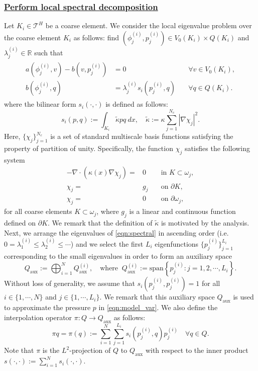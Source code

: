 \documentclass{article}[11pt]
\theoremstyle{definition}
\newcommand{\abs}[1]{\left |#1\right |}
\begin{document}
\subsubsection*{\underline{Perform local spectral decomposition}}
Let $K_i \in \mathcal{T}^H$ be a coarse element. %
We consider the local eigenvalue problem over the coarse element $K_i$ as follows: find $(\phi_j^{(i)}, p_j^{(i)}) \in V_0(K_i) \times Q(K_i)$ and $\lambda_j^{(i)} \in \mathbb{R}$ such that 
\begin{eqnarray}\label{eqn:spectral}
\begin{split}
a(\phi_{j}^{(i)}, v) - b(v, p_j^{(i)}) &=  0 & \quad \forall v \in V_0(K_i), \\
b(\phi_{j}^{(i)}, q) & = \lambda_j^{(i)} s_i ( p_j^{(i)},q)& \quad \forall q \in Q(K_i). 
\end{split}
\end{eqnarray}
where the bilinear form $s_i(\cdot,\cdot)$ is defined as follows:
$$ s_i(p,q) := \int_{K_i} \tilde \kappa pq ~ dx, \quad \tilde \kappa := \kappa \sum_{j=1}^{N_c} \abs{\nabla \chi_j}^2.$$
Here, $\{ \chi_j \}_{j=1}^{N_c}$ is a set of standard multiscale basis functions satisfying the property of partition of unity. 
Specifically, the function $\chi_j$ satisfies the following system%
\begin{eqnarray*}
    -\nabla \cdot \left (\kappa(x) \nabla \chi_j \right) = &  0 
                    &\quad \text{in }  K \subset \omega_j, \\
    \chi_j =  & g_j & \quad \text{on } \partial K, \\
    \chi_j = & 0 & \quad \text{on } \partial \omega_j,
\end{eqnarray*}
for all coarse elements $K \subset \omega_j$, where $g_j$ is a linear and continuous function defined on $\partial K$. 
We remark that the definition of $\tilde \kappa$ is motivated by the analysis. 
Next, we arrange the eigenvalues of \eqref{eqn:spectral} in ascending order (i.e. $0 = \lambda_1^{(i)} \leq \lambda_2^{(i)} \leq \cdots$) and we select the first $L_i$ eigenfunctions $\{ p_j^{(i)} \}_{j=1}^{L_i}$ corresponding to the small eigenvalues in order to form an auxiliary space 
$$ Q_{\text{aux}} := \bigoplus_{i=1}^N Q_{\text{aux}}^{(i)}, \quad \text{where }~ Q_{\text{aux}}^{(i)} := \text{span} \left \{ p_j^{(i)}:  j =1, 2, \cdots, L_i  \right \}.$$
Without loss of generality, we assume that $s_i( p_j^{(i)}, p_j^{(i)})= 1$ for all $i \in \{ 1, \cdots, N\}$ and $j \in \{ 1, \cdots, L_i \}$. 
We remark that this auxiliary space $Q_{\text{aux}}$ is used to approximate the pressure $p$ in \eqref{eqn:model_var}. We also define the interpolation operator $\pi : Q \to Q_{\text{aux}}$ as follows:
$$ \pi q = \pi (q) := \sum_{i=1}^N \sum_{j=1}^{L_i} s_i(p_j^{(i)}, q) p_j^{(i)} \quad \forall q\in Q.$$
Note that $\pi$ is the $L^2$-projection of $Q$ to $Q_{\text{aux}}$ with respect to the inner product $s(\cdot, \cdot) := \sum_{i=1}^N s_i(\cdot,\cdot)$. 
\end{document}
